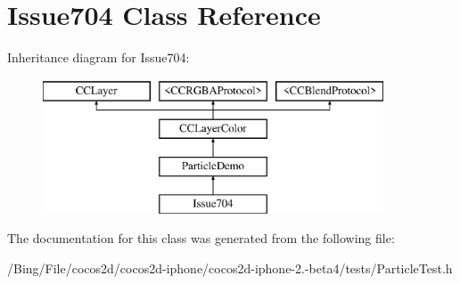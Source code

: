 \hypertarget{interface_issue704}{\section{Issue704 Class Reference}
\label{interface_issue704}
}
Inheritance diagram for Issue704\-:\begin{figure}[H]
\begin{center}
\leavevmode
\includegraphics[height=4.000000cm]{interface_issue704}
\end{center}
\end{figure}


The documentation for this class was generated from the following file\-:\begin{DoxyCompactItemize}
\item 
/\-Bing/\-File/cocos2d/cocos2d-\/iphone/cocos2d-\/iphone-\/2.-\/beta4/tests/Particle\-Test.\-h\end{DoxyCompactItemize}
